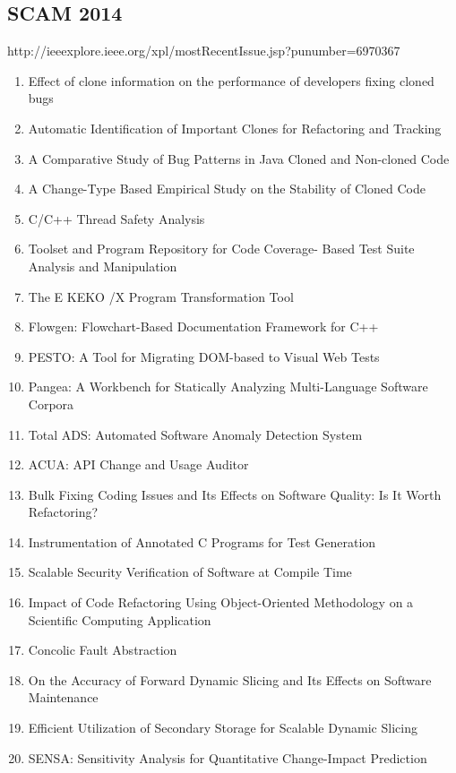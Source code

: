 \subsection{SCAM 2014}

http://ieeexplore.ieee.org/xpl/mostRecentIssue.jsp?punumber=6970367

\begin{enumerate}[itemsep=-1ex]
  \item Effect of clone information on the performance of developers fixing cloned bugs
  \item Automatic Identification of Important Clones for Refactoring and Tracking
  \item A Comparative Study of Bug Patterns in Java Cloned and Non-cloned Code
  \item A Change-Type Based Empirical Study on the Stability of Cloned Code
  \item C/C++ Thread Safety Analysis
  \item Toolset and Program Repository for Code Coverage- Based Test Suite Analysis and Manipulation
  \item The E KEKO /X Program Transformation Tool
  \item Flowgen: Flowchart-Based Documentation Framework for C++
  \item PESTO: A Tool for Migrating DOM-based to Visual Web Tests
  \item Pangea: A Workbench for Statically Analyzing Multi-Language Software Corpora
  \item Total ADS: Automated Software Anomaly Detection System
  \item ACUA: API Change and Usage Auditor
  \item Bulk Fixing Coding Issues and Its Effects on Software Quality: Is It Worth Refactoring?
  \item Instrumentation of Annotated C Programs for Test Generation
  \item Scalable Security Verification of Software at Compile Time
  \item Impact of Code Refactoring Using Object-Oriented Methodology on a Scientific Computing Application
  \item Concolic Fault Abstraction
  \item On the Accuracy of Forward Dynamic Slicing and Its Effects on Software Maintenance
  \item Efficient Utilization of Secondary Storage for Scalable Dynamic Slicing
  \item SENSA: Sensitivity Analysis for Quantitative Change-Impact Prediction

\end{enumerate}

